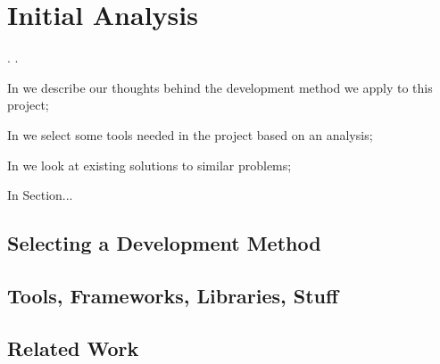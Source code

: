 \chapter{Initial Analysis}\label{chap:analysis}
\dummy . \dummy .

\begin{chapterorganization}
  \item In  we describe our thoughts behind the development method we apply to this project;
  \item In  we select some tools needed in the project based on an analysis;
  \item In  we look at existing solutions to similar problems;
  \item In Section...
\end{chapterorganization}

\section{Selecting a Development Method}\label{sec:selecting_devmethod}

\section{Tools, Frameworks, Libraries, Stuff}\label{sec:selecting_tools}

\section{Related Work}\label{sec:related_work}
\dummy